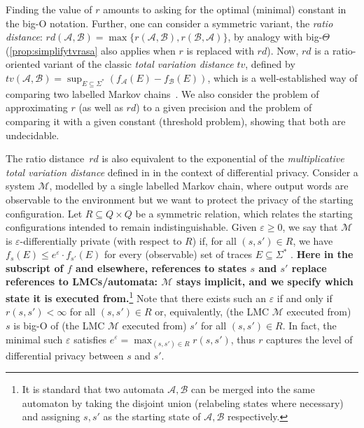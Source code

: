 \documentclass{lmcs}
\theoremstyle{plain}
\theoremstyle{definition}
\theoremstyle{remark}
\newcommand\lmc{\mathcal{M}}
\newcommand\tvra{\mathit{r}}
\newcommand\tvrs{\mathit{rd}}
\newcommand\tvstandard{\mathit{tv}}
\begin{document}
Finding the value of $\tvra$ amounts to  asking for the optimal (minimal) constant in the big-O notation.
Further, one can consider a symmetric variant, the \emph{ratio distance}:
$\tvrs(\mathcal A, \mathcal B) = \max\{\tvra(\mathcal A, \mathcal B),\tvra(\mathcal B, \mathcal A)\}$,
by analogy with big-$\Theta$ (\cref{prop:simplifytvrasa} also applies when $\tvra$ is replaced with $\tvrs$).
Now, $\tvrs$ is a ratio-oriented variant of the classic \emph{total variation distance} $\tvstandard$, defined by $\tvstandard(\mathcal A, \mathcal B) = \sup_{E \subseteq \Sigma^*} (f_{\mathcal A}(E) - f_{\mathcal B}(E))$,
which is a well-established way of comparing two labelled Markov chains~\cite{chen2014total,kiefer2018computing}.
We also consider
the problem of approximating $\tvra$ (as well as $\tvrs$)
to a given precision and the problem of comparing it with a given constant (threshold problem),
showing that both are undecidable.

The ratio distance~$\tvrs$ is  also equivalent to  the exponential of the  \emph{multiplicative total variation distance}
defined in \cite{chatzikokolakis2014generalized,DBLP:journals/corr/abs-0809-4794} in the context of differential privacy.
Consider a system $\lmc$, modelled by a single labelled Markov chain, where output words are observable to the environment but we want to protect the privacy of the starting configuration.  Let $R\subseteq Q\times Q$ be a symmetric relation, which relates the starting configurations intended to remain indistinguishable. Given $\varepsilon\ge 0$, we say that $\lmc$ is $\varepsilon$-differentially private (with respect to $R$) if, for all $(s,s')\in R$, we have
$f_s(E) \leq e^{\varepsilon}\cdot f_{s'}(E)$
for every (observable) set of traces $E\subseteq \Sigma^*$ \cite{dwork2006calibrating,chistikov2019asymmetric}.
\textbf{Here in the subscript of $f$ and elsewhere,
references to states $s$ and $s'$ replace references to LMCs/automata:
$\mathcal M$ stays implicit, and we specify
which state it is executed from.}\footnote{It is standard that two automata $\mathcal{A},\mathcal{B}$ can be merged into the same automaton by taking the disjoint union (relabeling states where necessary) and assigning $s,s'$ as the starting state of $\mathcal{A},\mathcal{B}$ respectively.} 
Note that there exists such an $\varepsilon$ if and only if $\tvra(s,s')<\infty$ for all $(s,s')\in R$ or, equivalently,
(the LMC $\mathcal M$ executed from)  $s$ is big-O of
(the LMC $\mathcal M$ executed from)  $s'$ for all $(s,s')\in R$.
In fact, the minimal such $\varepsilon$ satisfies $e^\varepsilon = \max_{(s,s')\in R} \tvra(s,s')$, thus $\tvra$ captures the level of differential privacy between $s$ and $s'$.
\end{document}
